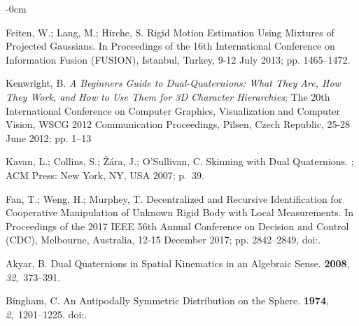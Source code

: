 \documentclass[micromachines,article,accept,pdftex,moreauthors]{Definitions/mdpi}
\begin{document}
\begin{adjustwidth}{-\extralength}{0cm}
\begin{thebibliography}{999}
Feiten, W.; Lang, M.; Hirche, S.
\newblock Rigid Motion Estimation Using Mixtures of Projected {{Gaussians}}.
\newblock In Proceedings of the 16th International Conference on Information Fusion {(FUSION), Istanbul, Turkey, 9-12 July 2013;} pp. 1465--1472.

 Kenwright, B.
\newblock \emph{A Beginners Guide to Dual-Quaternions: What They Are, How They Work, and How to Use Them for {{3D}} Character Hierarchies}; 
\newblock The 20th International Conference on Computer Graphics, Visualization and Computer Vision, WSCG 2012 Communication Proceedings,
{Pilsen, Czech Republic, 25-28 June 2012; pp. 1--13} %

 Kavan, L.; Collins, S.; {\v Z}{\'a}ra, J.; O'Sullivan, C.
\newblock Skinning with Dual Quaternions.
; {ACM Press: New York, NY, USA} %
2007; p.~39.

Fan, T.; Weng, H.; Murphey, T.
\newblock Decentralized and Recursive Identification for Cooperative Manipulation of Unknown Rigid Body with Local Measurements.
\newblock In Proceedings of the  2017 IEEE 56th Annual Conference on Decision and Control {(CDC), Melbourne, Australia, 12-15 December 2017;} pp. 2842--2849,
\newblock
doi:{\href{https://doi.org/10.1109/CDC.2017.8264073}{}}.

Akyar, B.
\newblock Dual {{Quaternions}} in {{Spatial Kinematics}} in an {{Algebraic Sense}}.
 {\bf 2008}, {\em 32},~373--391.

Bingham, C.
\newblock An {{Antipodally Symmetric Distribution}} on the {{Sphere}}.
 {\bf 1974}, {\em 2},~1201--1225.
\newblock
doi:{\href{https://doi.org/10.1214/aos/1176342874}{}}.


\end{thebibliography}
\end{adjustwidth}
\end{document}

